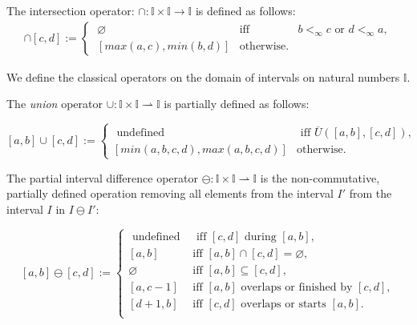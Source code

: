 The {intersection} operator: $ \cap:\mathbb{I} \times \mathbb{I}  \to \mathbb{I}$  is defined as follows:
	\begin{align*}
		[a,b] \cap [c,d] := 	\left\{
		\begin{array}{lll}
				~	\varnothing & \text{iff} &  b <_\infty c\text{ or } d <_\infty a, \\
			~ [max(a, c), min(b,d)] & \text{otherwise.}
		\end{array}
		\right.
	\end{align*}

We define the classical operators on the domain of intervals on natural numbers $\mathbb{I}$.

The \emph{union} operator $ \cup:\mathbb{I} \times \mathbb{I}  \rightharpoonup \mathbb{I}$ is partially defined as follows:

 $$[a,b] \cup [c,d] := \begin{cases}
		\text{ undefined }& \text{ iff } \overline{U}([a,b],[c,d]) ,\\
		[min(a,b,c,d),max(a,b,c,d)] & \text{otherwise.}
	\end{cases}$$

The partial interval difference operator $\ominus: \mathbb{I} \times \mathbb{I} \rightharpoonup \mathbb{I}$ is the non-commutative, partially defined operation removing all elements from the interval  $I'$ from the interval $I$ in $I \ominus I'$:

$$[a,b] \ominus [c,d] := \begin{cases}
		\text{ undefined }& \text{ iff   } [c,d] \text{ during } [a,b],\\
		[a,b] & \text{iff   } [a,b] \cap [c,d]= \varnothing,\\
  \varnothing & \text{iff   } [a,b] \subseteq [c,d],\\
  [a,c-1] & \text{iff   } [a,b] \text{ overlaps or finished by } [c,d],\\
  [d+1,b] & \text{iff   } [c,d] \text{ overlaps or starts  } [a,b].\\
	\end{cases}$$

